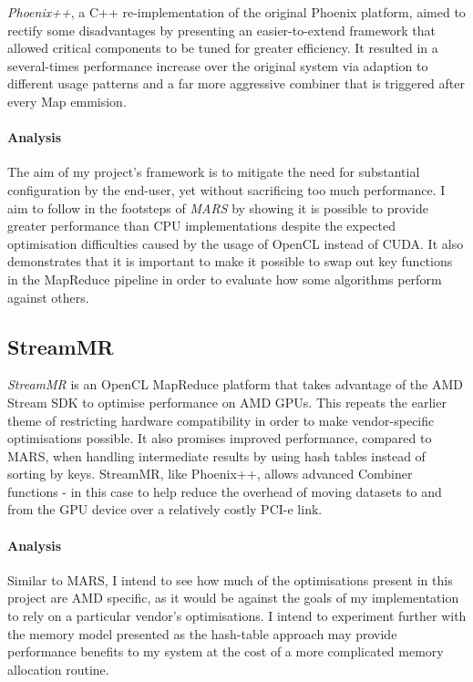 \emph{Phoenix++}\cite{phoenix++}, a C++ re-implementation of the original Phoenix platform, aimed to rectify some disadvantages by presenting an easier-to-extend framework that allowed critical components to be tuned for greater efficiency. It resulted in a several-times performance increase over the original system via adaption to different usage patterns and a far more aggressive combiner that is triggered after every Map emmision.

\paragraph{Analysis}
The aim of my project's framework is to mitigate the need for substantial configuration by the end-user, yet without sacrificing too much performance. I aim to follow in the footsteps of \emph{MARS} by showing it is possible to provide greater performance than CPU implementations despite the expected optimisation difficulties caused by the usage of OpenCL instead of CUDA.
It also demonstrates that it is important to make it possible to swap out key functions in the MapReduce pipeline in order to evaluate how some algorithms perform against others.

\subsection{StreamMR}
\emph{StreamMR}\cite{streammr} is an OpenCL MapReduce platform that takes advantage of the AMD Stream SDK to optimise performance on AMD \ac{GPUs}. This repeats the earlier theme of restricting hardware compatibility in order to make vendor-specific optimisations possible. It also promises improved performance, compared to MARS, when handling intermediate results by using hash tables instead of sorting by keys. StreamMR, like Phoenix++, allows advanced Combiner functions - in this case to help reduce the overhead of moving datasets to and from the GPU device over a relatively costly PCI-e link.

\paragraph{Analysis}
Similar to MARS, I intend to see how much of the optimisations present in this project are AMD specific, as it would be against the goals of my implementation to rely on a particular vendor's optimisations. I intend to experiment further with the memory model presented as the hash-table approach may provide performance benefits to my system at the cost of a more complicated memory allocation routine.
